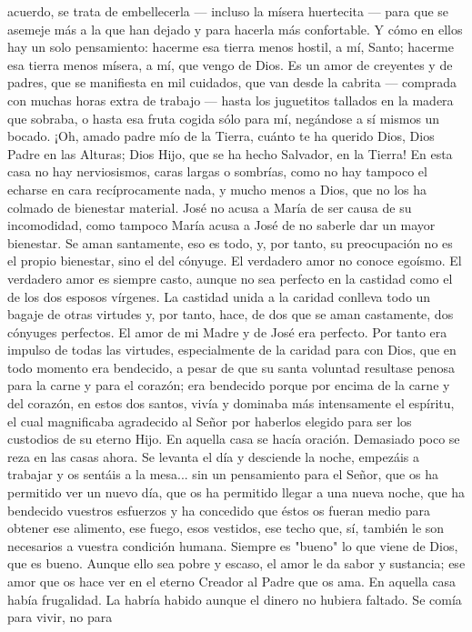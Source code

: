 \documentclass[12pt]{book} %
\begin{document}
acuerdo, se trata de embellecerla — incluso la mísera huertecita — para que se asemeje más a la que han dejado y para hacerla más confortable. Y cómo en ellos hay un solo pensamiento: hacerme esa tierra menos hostil, a mí, Santo; hacerme esa tierra menos mísera, a mí, que vengo de Dios. Es un amor de creyentes y de padres, que se manifiesta en mil cuidados, que van desde la cabrita — comprada con muchas horas extra de trabajo — hasta los juguetitos tallados en la madera que sobraba, o hasta esa fruta cogida sólo para mí, negándose a sí mismos un bocado. 
¡Oh, amado padre mío de la Tierra, cuánto te ha querido Dios, Dios Padre en las Alturas; Dios Hijo, que se ha hecho Salvador, en la Tierra! 
En esta casa no hay nerviosismos, caras largas o sombrías, como no hay tampoco el echarse en cara recíprocamente nada, y mucho menos a Dios, que no los ha colmado de bienestar material. José no acusa a María de ser causa de su incomodidad, como tampoco María acusa a José de no saberle dar un mayor bienestar. Se aman santamente, eso es todo, y, por tanto, su preocupación no es el propio bienestar, sino el del cónyuge. El verdadero amor no conoce egoísmo. El verdadero amor es siempre casto, aunque no sea perfecto en la castidad como el de los dos esposos vírgenes. La castidad unida a la caridad conlleva todo un bagaje de otras virtudes y, por tanto, hace, de dos que se aman castamente, dos cónyuges perfectos. 
El amor de mi Madre y de José era perfecto. Por tanto era impulso de todas las virtudes, especialmente de la caridad para con Dios, que en todo momento era bendecido, a pesar de que su santa voluntad resultase penosa para la carne y para el corazón; era bendecido porque por encima de la carne y del corazón, en estos dos santos, vivía y dominaba más intensamente el espíritu, el cual magnificaba agradecido al Señor por haberlos elegido para ser los custodios de su eterno Hijo. 
En aquella casa se hacía oración. Demasiado poco se reza en las casas ahora. Se levanta el día y desciende la noche, 
empezáis a trabajar y os sentáis a la mesa... sin un pensamiento para el Señor, que os ha permitido ver un nuevo día, que os ha permitido llegar a una nueva noche, que ha bendecido vuestros esfuerzos y ha concedido que éstos os fueran medio para obtener ese alimento, ese fuego, esos vestidos, ese techo que, sí, también le son necesarios a vuestra condición humana. 
Siempre es "bueno" lo que viene de Dios, que es bueno. Aunque ello sea pobre y escaso, el amor le da sabor y sustancia; ese amor que os hace ver en el eterno Creador al Padre que os ama. 
En aquella casa había frugalidad. La habría habido aunque el dinero no hubiera faltado. Se comía para vivir, no para 
\end{document}
